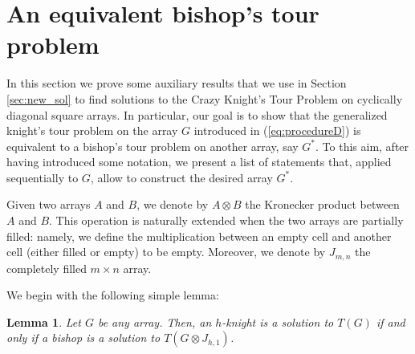\documentclass{amsart}
\newtheorem{lem}[prop]{Lemma}
\theoremstyle{definition}
\numberwithin{equation}{section}
\begin{document}
\section{An equivalent bishop's tour problem} \label{sec:aux_lem}
In this section we prove some auxiliary results that we use in Section \ref{sec:new_sol} to find solutions to the Crazy Knight's Tour Problem on cyclically diagonal square arrays. In particular, our goal is to show that the generalized knight's tour problem on the array $G$ introduced in (\ref{eq:procedureD}) is equivalent to a bishop's tour problem on another array, say $G^*$. To this aim, after having introduced some notation, we present a list of statements that, applied sequentially to $G$, allow to construct the desired array $G^*$. 

 Given two arrays $A$ and $B$, we denote by $A \otimes B$ the Kronecker product between $A$ and $B$. This operation is naturally extended when the two arrays are partially filled: namely, we define the multiplication between an empty cell and another cell (either filled or empty) to be empty.
Moreover, we denote by $J_{m,n}$ the completely filled $m \times n$ array.


We begin with the following simple lemma:
\begin{lem} \label{lem:eq_h_knight_bishop}
Let $G$ be any array. Then, an $h$-knight is a solution to $T(G)$ if and only if a bishop is a solution to $T(G \otimes J_{h,1})$.
\end{lem}
\end{document}
